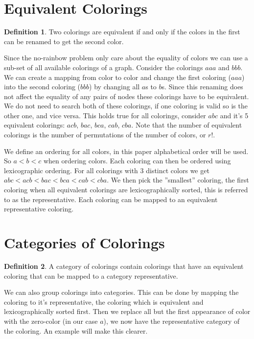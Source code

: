 \documentclass{book}
\theoremstyle{definition}
\newtheorem{definition}{Definition}[section]
\begin{document}
\section{Equivalent Colorings}
\begin{definition}
  Two colorings are equivalent if and only if the colors in the first can be renamed to get the second color.
\end{definition}
Since the no-rainbow problem only care about the equality of colors we can use a sub-set of all available colorings of a graph. Consider the colorings $aaa$ and $bbb$. We can create a mapping from color to color and change the first coloring ($aaa$) into the second coloring ($bbb$) by changing all $a$s to $b$s. Since this renaming does not affect the equality of any pairs of nodes these colorings have to be equivalent. We do not need to search both of these colorings, if one coloring is valid so is the other one, and vice versa. This holds true for all colorings, consider $abc$ and it's 5 equivalent colorings: $acb$, $bac$, $bca$, $cab$, $cba$. Note that the number of equivalent colorings is the number of permutations of the number of colors, or $r!$.

We define an ordering for all colors, in this paper alphabetical order will be used. So $a < b < c$ when ordering colors. Each coloring can then be ordered using lexicographic ordering. For all colorings with 3 distinct colors we get $abc < acb < bac < bca < cab < cba$. We then pick the ''smallest'' coloring, the first coloring when all equivalent colorings are lexicographically sorted, this is referred to as the representative. Each coloring can be mapped to an equivalent representative coloring.

\section{Categories of Colorings} \label{sec:map-cat}
\begin{definition}
  A category of colorings contain colorings that have an equivalent coloring that can be mapped to a category representative. 
\end{definition}

We can also group colorings into categories. This can be done by mapping the coloring to it's representative, the coloring which is equivalent and lexicographically sorted first. Then we replace all but the first appearance of color with the zero-color (in our case $a$), we now have the representative category of the coloring. An example will make this clearer.
\end{document}
